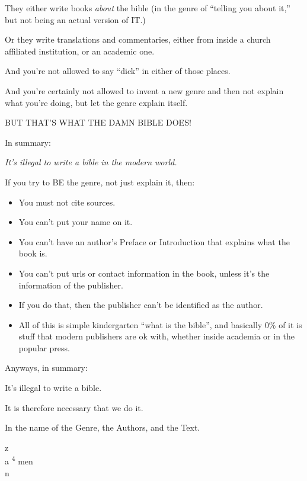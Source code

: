 They either write books \emph{about} the bible (in the genre of ``telling you about it,'' but not being an actual version of IT.)

Or they write translations and commentaries, either from inside a church affiliated institution, or an academic one.

And you're not allowed to say ``dick'' in either of those places.

And you're certainly not allowed to invent a new genre and then not explain what you're doing, but let the genre explain itself.

BUT THAT'S WHAT THE DAMN BIBLE DOES!

In summary:

\emph{It's illegal to write a bible in the modern world.}

If you try to BE the genre, not just explain it, then:

\begin{itemize}

\item You must not cite sources.

\item You can't put your name on it.

\item You can't have an author's Preface or Introduction that explains what the book is.

\item You can't put urls or contact information in the book, unless it's the information of the publisher.

\item If you do that, then the publisher can't be identified as the author.

\item All of this is simple kindergarten ``what is the bible'', and basically 0\% of it is stuff that modern publishers are ok with, whether inside academia or in the popular press.

\end{itemize}

Anyways, in summary:

It's illegal to write a bible.

It is therefore necessary that we do it.

In the name of the Genre, the Authors, and the Text.

\noindent z\\
a \textsuperscript{4} men\\
n

